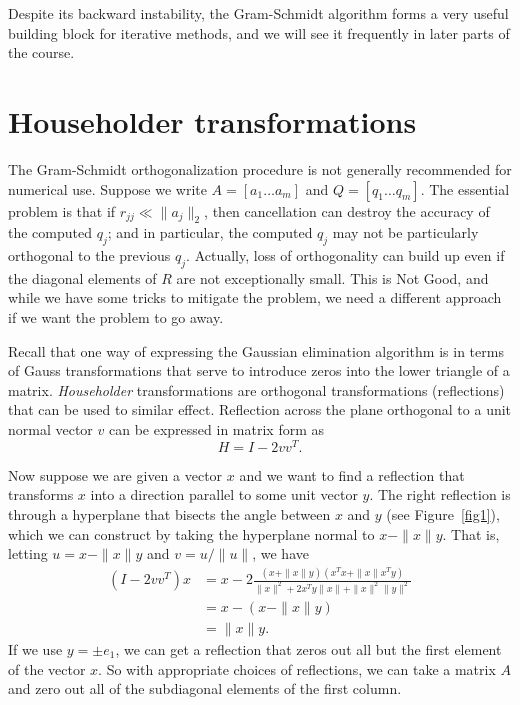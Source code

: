 \documentclass[12pt, leqno]{article} %
\begin{document}
Despite its backward instability, the Gram-Schmidt algorithm forms a very
useful building block for iterative methods, and we will see it frequently
in later parts of the course.

\section{Householder transformations}

The Gram-Schmidt orthogonalization procedure is not generally
recommended for numerical use.  Suppose we write $A = [a_1 \ldots
  a_m]$ and $Q = [q_1 \ldots q_m]$.  The essential problem is that if
$r_{jj} \ll \|a_j\|_2$, then cancellation can destroy the accuracy of
the computed $q_j$; and in particular, the computed $q_j$ may not be
particularly orthogonal to the previous $q_j$.  Actually, loss of
orthogonality can build up even if the diagonal elements of $R$ are
not exceptionally small.  This is Not Good, and while we have some
tricks to mitigate the problem, we need a different approach if we
want the problem to go away.

Recall that one way of expressing the Gaussian elimination algorithm
is in terms of Gauss transformations that serve to introduce zeros
into the lower triangle of a matrix.  {\em Householder} transformations
are orthogonal transformations (reflections) that can be used to similar
effect.  Reflection across the plane orthogonal to a unit normal
vector $v$ can be expressed in matrix form as
\[
  H = I-2 vv^T.
\]

Now suppose we are given a vector $x$ and we want to find a reflection
that transforms $x$ into a direction parallel to some unit vector $y$.
The right reflection is through a hyperplane that bisects the angle
between $x$ and $y$ (see Figure~\ref{fig1}), which we can construct
by taking the hyperplane normal to $x-\|x\|y$.  That is,
letting $u = x - \|x\|y$ and $v = u/\|u\|$, we have
\begin{align*}
  (I-2vv^T)x
  & = x - 2\frac{(x+\|x\|y)(x^T x + \|x\| x^T y)}{\|x\|^2 + 2 x^T y \|x\| + \|x\|^2 \|y\|^2} \\
  & = x - (x-\|x\|y) \\
  & = \|x\|y.
\end{align*}
If we use $y = \pm e_1$, we can get a reflection that zeros out all but the
first element of the vector $x$.  So with appropriate choices of reflections,
we can take a matrix $A$ and zero out all of the subdiagonal elements
of the first column.
\end{document}
